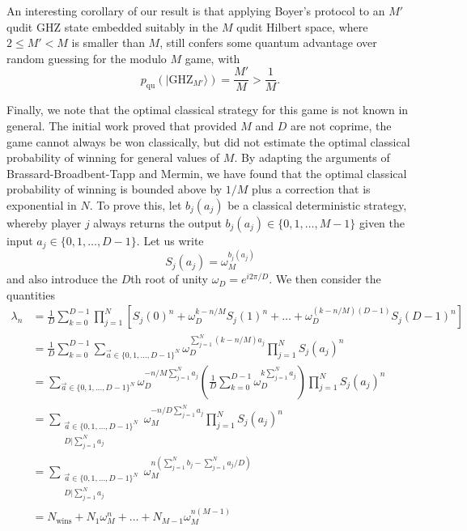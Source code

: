 \documentclass[prb,twocolumn,showpacs,amssymb,superscriptaddress]{revtex4-2}
\begin{document}
An interesting corollary of our result is that applying Boyer's protocol to an $M'$ qudit GHZ state embedded suitably in the $M$ qudit Hilbert space, where $2 \leq M' <M$ is smaller than $M$, still confers some quantum advantage over random guessing for the modulo $M$ game, with
\begin{equation}
p_{\mathrm{qu}}(|\mathrm{GHZ}_{M'}\rangle) = \frac{M'}{M} > \frac{1}{M}.
\end{equation}


Finally, we note that the optimal classical strategy for this game is not known in general. The initial work\cite{boyer2004extended} proved that provided $M$ and $D$ are not coprime, the game cannot always be won classically, but did not estimate the optimal classical probability of winning for general values of $M$. By adapting the arguments of Brassard-Broadbent-Tapp\cite{brassard2005recasting} and Mermin\cite{mermin1990extreme}, we have found that the optimal classical probability of winning is bounded above by $1/M$ plus a correction that is exponential in $N$. To prove this, let $b_j(a_j)$ be a classical deterministic strategy, whereby player $j$ always returns the output $b_j(a_j) \in \{0,1,\ldots,M-1\}$ given the input $a_j \in \{0,1,\ldots,D-1\}$. Let us write
\begin{equation}
S_{j}(a_j) = \omega_M^{b_j(a_j)}
\end{equation}
and also introduce the $D$th root of unity $\omega_D = e^{i2\pi/D}$. We then consider the quantities
\begin{align}
\nonumber \lambda_n &= \frac{1}{D} \sum_{k=0}^{D-1} \prod_{j=1}^N \left[S_{j}(0)^n + \omega_D^{k-n/M}S_{j}(1)^n + \ldots + \omega_D^{(k-n/M)(D-1)}S_{j}(D-1)^n \right] \\
\nonumber &= \frac{1}{D} \sum_{k=0}^{D-1} \sum_{\vec{a} \in \{0,1,\ldots,D-1\}^N} \omega_D^{\sum_{j=1}^N (k-n/M)a_j} \prod_{j=1}^N S_{j}(a_j)^n \\
\nonumber &=\sum_{\vec{a} \in \{0,1,\ldots,D-1\}^N} \omega_D^{-n/M\sum_{j=1}^N a_j} \left(\frac{1}{D} \sum_{k=0}^{D-1}  \omega_D^{k \sum_{j=1}^N a_j}\right) \prod_{j=1}^N S_{j}(a_j)^n \\
\nonumber &=\sum_{\substack{\vec{a} \in \{0,1,\ldots,D-1\}^N \\ D | \sum_{j=1}^N a_j }} \omega_M^{-n/D\sum_{j=1}^N a_j } \prod_{j=1}^N S_{j}(a_j)^n \\
\nonumber &= \sum_{\substack{\vec{a} \in \{0,1,\ldots,D-1\}^N \\ D | \sum_{j=1}^N a_j }} \omega_M^{n \left(\sum_{j=1}^N b_j -\sum_{j=1}^N a_j/D\right)}\\
&= N_{\mathrm{wins}} + N_{1} \omega^n_M + \ldots + N_{M-1} \omega_M^{n(M-1)}
\end{align}
\end{document}

